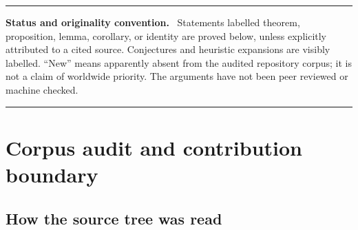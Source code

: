 \documentclass[11pt,oneside]{article}
\numberwithin{equation}{section}
\theoremstyle{definition}
\theoremstyle{remark}
\newcommand{\eps}{\varepsilon}
\newenvironment{statusbox}[1]{%
  \par\smallskip\noindent\begin{center}\begin{minipage}{0.94\textwidth}%
  \hrule\vspace{0.55em}\textbf{#1.}\ }{%
  \vspace{0.55em}\hrule\end{minipage}\end{center}\smallskip}
\begin{document}
\begin{abstract}
For the signed log-moment correction we obtain the Mellin transform
\[
 \MellinTransformSymbol J(s)=-\Gamma(s)\zeta(s+1)E(2^s),
 \qquad -2<\Re s<-1,
\]
and hence a natural boundary at $\Re s=0$.  The natural-boundary ingredient itself is
already occupied in the repository; its appearance here is recorded as a consequence
for the new factors, not as a new general theorem.  Finally, a selector-density theorem
gives sharp logarithmic edge asymptotics.  If a scale set has density $\delta$ and bounded
discrepancy, then
\[
 \log\Pr(R_A-X_A\le\eps)
 =-\frac{\delta}{2\log2}\left(\log\frac1\eps\right)^2
 +\BigO\!\left(\log\frac1\eps\log\log\frac1\eps\right).
\]
For both Thue--Morse factors $\delta=1/2$.  Inverting this law yields a new stretched
exponential endpoint scale for their quantile functions.  The report includes complete
proofs of the stated results, numerical verification, conjectural symbolic-hull refinements,
and a Lean formalization blueprint.
\end{abstract}

\begin{statusbox}{Status and originality convention}
Statements labelled theorem, proposition, lemma, corollary, or identity are proved below,
unless explicitly attributed to a cited source.  Conjectures and heuristic expansions are
visibly labelled.  ``New'' means apparently absent from the audited repository corpus; it
is not a claim of worldwide priority.  The arguments have not been peer reviewed or
machine checked.
\end{statusbox}

\tableofcontents
\clearpage

\section{Corpus audit and contribution boundary}
\label{sec:audit}

\subsection{How the source tree was read}
\end{document}
